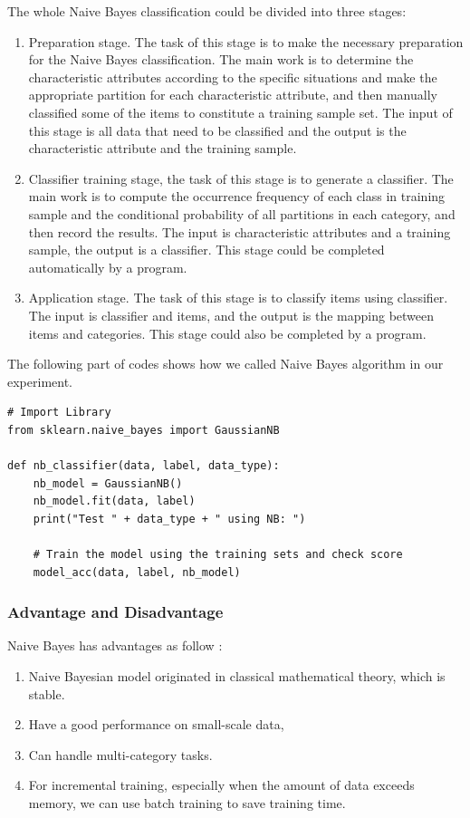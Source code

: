 \documentclass[sigconf]{acmart}
\begin{document}
The whole Naive Bayes classification could be divided into three stages:
\begin{enumerate}
    \item Preparation stage. The task of this stage is to make the necessary preparation for the Naive Bayes classification. The main work is to determine the characteristic attributes according to the specific situations and make the appropriate partition for each characteristic attribute, and then manually classified some of the items to constitute a training sample set. The input of this stage is all data that need to be classified and the output is the characteristic attribute and the training sample.
    \item Classifier training stage, the task of this stage is to generate a classifier. The main work is to compute the occurrence frequency of each class in training sample and the conditional probability of all partitions in each category, and then record the results. The input is characteristic attributes and a training sample, the output is a classifier. This stage could be completed automatically by a program.
    \item Application stage. The task of this stage is to classify items using classifier. The input is classifier and items, and the output is the mapping between items and categories. This stage could also be completed by a program.
\end{enumerate}

The following part of codes shows how we called Naive Bayes algorithm in our experiment.
\begin{lstlisting}
# Import Library
from sklearn.naive_bayes import GaussianNB

def nb_classifier(data, label, data_type):
    nb_model = GaussianNB()
    nb_model.fit(data, label)
    print("Test " + data_type + " using NB: ")
    
    # Train the model using the training sets and check score
    model_acc(data, label, nb_model)
\end{lstlisting}

\subsubsection{Advantage and Disadvantage}
Naive Bayes has advantages as follow \cite{NB}:
\begin{enumerate}
    \item Naive Bayesian model originated in classical mathematical theory, which is stable.
    \item Have a good performance on small-scale data,
    \item Can handle multi-category tasks.
    \item For incremental training, especially when the amount of data exceeds memory, we can use batch training to save training time.
\end{enumerate}
\end{document}
